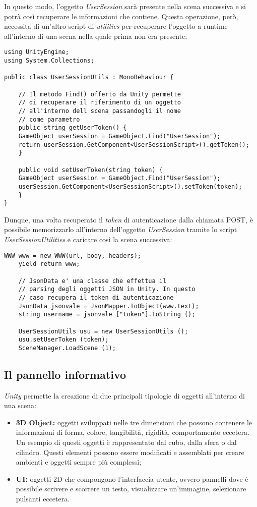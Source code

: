 In questo modo, l'oggetto \textit{UserSession} sarà presente nella scena successiva e si potrà così recuperare le informazioni che contiene. Questa operazione, però, necessita di un'altro script di \textit{utilities} per recuperare l'oggetto a runtime all'interno di una scena nella quale prima non era presente:

\begin{lstlisting}[style=MyCStyle]
using UnityEngine;
using System.Collections;

public class UserSessionUtils : MonoBehaviour {

	// Il metodo Find() offerto da Unity permette 
	// di recuperare il riferimento di un oggetto
	// all'interno dell scena passandogli il nome
	// come parametro
	public string getUserToken() {
	GameObject userSession = GameObject.Find("UserSession");
	return userSession.GetComponent<UserSessionScript>().getToken();
	}

	public void setUserToken(string token) {
	GameObject userSession = GameObject.Find("UserSession");
	userSession.GetComponent<UserSessionScript>().setToken(token);
	}
}
\end{lstlisting}

Dunque, una volta recuperato il \textit{token} di autenticazione dalla chiamata POST, è possibile memorizzarlo all'interno dell'oggetto \textit{UserSession} tramite lo script \textit{UserSessionUtilities} e caricare così la scena successiva:

\begin{lstlisting}[style=MyCStyle]
	WWW www = new WWW(url, body, headers);
	yield return www;
	
	// JsonData e' una classe che effettua il  
	// parsing degli oggetti JSON in Unity. In questo  
	// caso recupera il token di autenticazione
	JsonData jsonvale = JsonMapper.ToObject(www.text);
	string username = jsonvale ["token"].ToString ();
	
	UserSessionUtils usu = new UserSessionUtils ();
	usu.setUserToken (token);
	SceneManager.LoadScene (1);
\end{lstlisting}

\subsection{Il pannello informativo}
\textit{Unity} permette la creazione di due principali tipologie di oggetti all'interno di una scena:

\begin{itemize}
	\item \textbf{3D Object:} oggetti sviluppati nelle tre dimensioni che possono contenere le informazioni di forma, colore, tangibilità, rigidità, comportamento eccetera. \\
	Un esempio di questi oggetti è rappresentato dal cubo, dalla sfera o dal cilindro. Questi elementi possono essere modificati e assemblati per creare ambienti e oggetti sempre più complessi;
	\item \textbf{UI:} oggetti 2D che compongono l'interfaccia utente, ovvero pannelli dove è possibile scrivere e scorrere un testo, visualizzare un'immagine, selezionare pulsanti eccetera.
\end{itemize}

